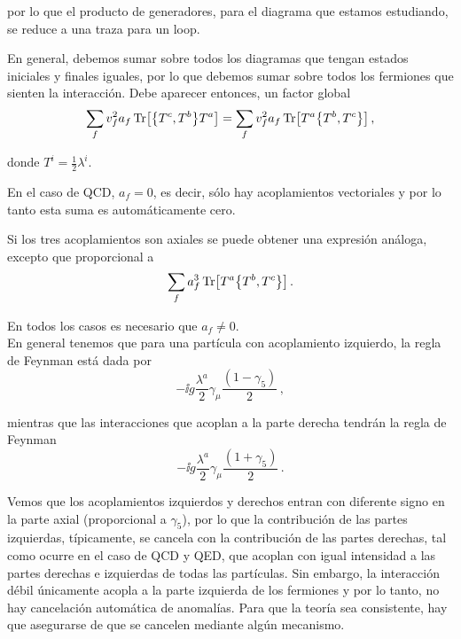 \noindent por lo que el producto de generadores, para el diagrama que estamos estudiando, se reduce a una traza para un loop.

En general, debemos sumar sobre todos los diagramas que tengan estados iniciales y finales iguales, por lo que debemos sumar sobre todos los fermiones que sienten la interacción. Debe aparecer entonces, un factor global
%
\begin{equation}
	\sum_f v_f^2 a_f \Tr[\acomm{T^c}{T^b}T^a] = \sum_f v_f^2 a_f \Tr[T^a \acomm{T^b}{T^c}] \,,
\end{equation}

\noindent donde $T^i = \frac{1}{2}\lambda^i$.

En el caso de QCD, $a_f = 0$, es decir, sólo hay acoplamientos vectoriales y por lo tanto esta suma es automáticamente cero.

Si los tres acoplamientos son axiales se puede obtener una expresión análoga, excepto que proporcional a
%
\begin{equation}
	\sum_f a_f^3 \Tr[T^a \acomm{T^b}{T^c}] \,.
\end{equation}

En todos los casos es necesario que $a_f \neq 0$. \\

En general tenemos que para una partícula con acoplamiento izquierdo, la regla de Feynman está dada por
%
\begin{equation}
	- \ii g \frac{\lambda^a}{2} \gamma_\mu \frac{(1 - \gamma_5)}{2} \,,
\end{equation}

\noindent mientras que las interacciones que acoplan a la parte derecha tendrán la regla de Feynman
%
\begin{equation}
	- \ii g \frac{\lambda^a}{2} \gamma_\mu \frac{(1 + \gamma_5)}{2} \,.
\end{equation}

Vemos que los acoplamientos izquierdos y derechos entran con diferente signo en la parte axial (proporcional a $\gamma_5$), por lo que la contribución de las partes izquierdas, típicamente, se cancela con la contribución de las partes derechas, tal como ocurre en el caso de QCD y QED, que acoplan con igual intensidad a las partes derechas e izquierdas de todas las partículas. Sin embargo, la interacción débil únicamente acopla a la parte izquierda de los fermiones y por lo tanto, no hay cancelación automática de anomalías. Para que la teoría sea consistente, hay que asegurarse de que se cancelen mediante algún mecanismo.

